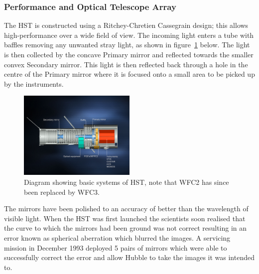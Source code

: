 	\subsubsection{Performance and Optical Telescope Array} %
	\label{ssub:performance_and_optical_telescope_array}
		The HST is constructed using a Ritchey-Chretien Cassegrain design; this allows high-performance over a wide field of view. The incoming light enters a tube with baffles removing any unwanted stray light, as shown in figure~\ref{fig:HST_optical_diagram} below. The light is then collected by the concave Primary mirror and reflected towards the smaller convex Secondary mirror. This light is then reflected back through a hole in the centre of the Primary mirror where it is focused onto a small area to be picked up by the instruments\cite{Hubsite_5}.
		\begin{figure}[ht]
			\centering
			\includegraphics[width=0.5\textwidth]{../Images/HST_optical_diagram.jpg}
			\caption{Diagram showing basic systems of HST, note that WFC2 has since been replaced by WFC3.\label{fig:HST_optical_diagram}}
		\end{figure}

		The mirrors have been polished to an accuracy of better than the wavelength of visible light. When the HST was first launched the scientists soon realised that the curve to which the mirrors had been ground was not correct resulting in an error known as spherical aberration which blurred the images. A servicing mission in December 1993 deployed 5 pairs of mirrors which were able to successfully correct the error and allow Hubble to take the images it was intended to\cite{ESA_1}.

